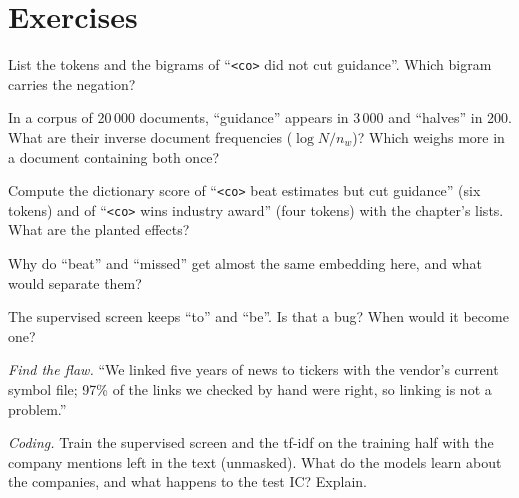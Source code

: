 \section{Exercises}

\begin{exercise}[$\star$]\label{exo:ml:text-from-bag-of-words-to-embeddings:1}
List the tokens and the bigrams of ``\texttt{<co>} did not cut guidance''. Which bigram carries the negation?
\end{exercise}

\begin{exercise}[$\star$]\label{exo:ml:text-from-bag-of-words-to-embeddings:2}
In a corpus of 20\,000 documents, ``guidance'' appears in 3\,000 and ``halves'' in 200. What are their inverse document
frequencies ($\log N/n_w$)? Which weighs more in a document containing both once?
\end{exercise}

\begin{exercise}[$\star$]\label{exo:ml:text-from-bag-of-words-to-embeddings:3}
Compute the dictionary score of ``\texttt{<co>} beat estimates but cut guidance'' (six tokens) and of ``\texttt{<co>} wins
industry award'' (four tokens) with the chapter's lists. What are the planted effects?
\end{exercise}

\begin{exercise}[$\star\star$]\label{exo:ml:text-from-bag-of-words-to-embeddings:4}
Why do ``beat'' and ``missed'' get almost the same embedding here, and what would separate them?
\end{exercise}

\begin{exercise}[$\star\star$]\label{exo:ml:text-from-bag-of-words-to-embeddings:5}
The supervised screen keeps ``to'' and ``be''. Is that a bug? When would it become one?
\end{exercise}

\begin{exercise}[$\star\star$]\label{exo:ml:text-from-bag-of-words-to-embeddings:6}
\emph{Find the flaw.} ``We linked five years of news to tickers with the vendor's current symbol file; 97\% of the links we
checked by hand were right, so linking is not a problem.''
\end{exercise}

\begin{exercise}[$\star\star\star$]\label{exo:ml:text-from-bag-of-words-to-embeddings:7}
\emph{Coding.} Train the supervised screen and the tf-idf  on the training half with the company
mentions left in the text (unmasked). What do the models learn about the companies, and what happens to the test IC? Explain.
\end{exercise}

